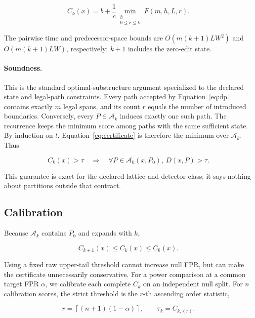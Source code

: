 \documentclass[10pt]{article}
\begin{document}
\begin{equation}
C_k(x)=b+\frac{1}{c}
\min_{\substack{h\\0\leq r\leq k}}F(m,h,L,r).
\label{eq:certificate}
\end{equation}

The pairwise time and predecessor-space bounds are $O(m(k+1)LW^2)$ and
$O(m(k+1)LW)$, respectively; $k+1$ includes the zero-edit state.

\paragraph{Soundness.}
This is the standard optimal-substructure argument specialized to the
declared state and legal-path constraints.
Every path accepted by Equation~\ref{eq:dp} contains exactly $m$ legal spans,
and its count $r$ equals the number of introduced boundaries. Conversely,
every $P\in\mathcal A_k$ induces exactly one such path. The recurrence keeps
the minimum score among paths with the same sufficient state. By induction on
$t$, Equation~\ref{eq:certificate} is therefore the minimum over
$\mathcal A_k$. Thus

\begin{equation}
C_k(x)>\tau
\quad\Longrightarrow\quad
\forall P\in\mathcal A_k(x,P_0),\ D(x,P)>\tau.
\end{equation}

This guarantee is exact for the declared lattice and detector class; it says
nothing about partitions outside that contract.

\subsection{Calibration}

Because $\mathcal A_k$ contains $P_0$ and expands with $k$,

\begin{equation}
C_{k+1}(x)\leq C_k(x)\leq C_0(x).
\end{equation}

Using a fixed raw upper-tail threshold cannot increase null FPR, but can make
the certificate unnecessarily conservative. For a power comparison at a
common target FPR $\alpha$, we calibrate each complete $C_k$ on an independent
null split. For $n$ calibration scores, the strict threshold is the
$r$-th ascending order statistic,

\begin{equation}
r=\left\lceil(n+1)(1-\alpha)\right\rceil,
\qquad \tau_k=C_{k,(r)}.
\end{equation}
\end{document}
